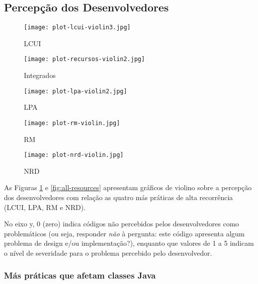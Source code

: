 \subsection{Percepção dos Desenvolvedores}

\begin{figure*}
\centering
\begin{subfigure}{.22\textwidth}
  \centering
  \texttt{[image: plot-lcui-violin3.jpg]}
  \caption{LCUI}
  \label{fig:lcui}
\end{subfigure}%
\begin{subfigure}{.17\textwidth}
  \centering
  \texttt{[image: plot-recursos-violin2.jpg]}
  \caption{Integrados}
  \label{fig:resources}
\end{subfigure}%
\begin{subfigure}{.17\textwidth}
  \centering
  \texttt{[image: plot-lpa-violin2.jpg]}
  \caption{LPA}
  \label{fig:lpa}
\end{subfigure}%
\begin{subfigure}{.17\textwidth}
  \centering
  \texttt{[image: plot-rm-violin.jpg]}
  \caption{RM}
  \label{fig:rm}
\end{subfigure}
\begin{subfigure}{.17\textwidth}
  \centering
  \texttt{[image: plot-nrd-violin.jpg]}
  \caption{NRD}
  \label{fig:nrd}
\end{subfigure}%
\caption{Gráficos violino individuais das más práticas que afetam recursos (LPA, RM e NRD).}
\label{fig:all-resources}
\vspace{-.7cm} 
\end{figure*}


As Figuras \ref{fig:lcui} e \ref{fig:all-resources} apresentam gráficos de violino sobre a percepção dos desenvolvedores com relação as quatro más práticas de alta recorrência (LCUI, LPA, RM e NRD). 

No eixo y, 0 (zero) indica códigos não percebidos pelos desenvolvedores como problemáticos (ou seja, responder \emph{não} à pergunta: este código apresenta algum problema de design e/ou implementação?), enquanto que valores de 1 a 5 indicam o nível de severidade para o problema percebido pelo desenvolvedor.

\subsubsection{Más práticas que afetam classes Java}

